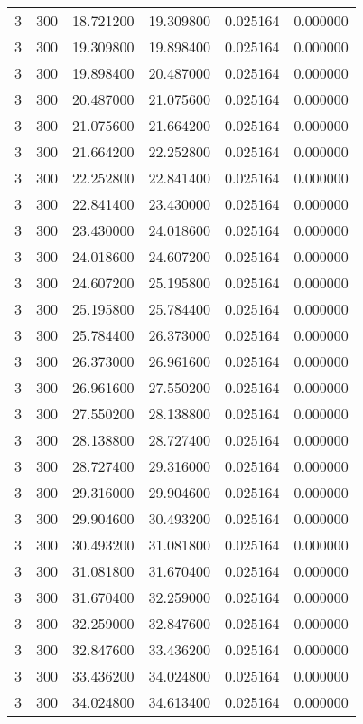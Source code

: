\begin{longtable}{rrrrrr}
3 & 300 & 18.721200 & 19.309800 & 0.025164 & 0.000000 \\
3 & 300 & 19.309800 & 19.898400 & 0.025164 & 0.000000 \\
3 & 300 & 19.898400 & 20.487000 & 0.025164 & 0.000000 \\
3 & 300 & 20.487000 & 21.075600 & 0.025164 & 0.000000 \\
3 & 300 & 21.075600 & 21.664200 & 0.025164 & 0.000000 \\
3 & 300 & 21.664200 & 22.252800 & 0.025164 & 0.000000 \\
3 & 300 & 22.252800 & 22.841400 & 0.025164 & 0.000000 \\
3 & 300 & 22.841400 & 23.430000 & 0.025164 & 0.000000 \\
3 & 300 & 23.430000 & 24.018600 & 0.025164 & 0.000000 \\
3 & 300 & 24.018600 & 24.607200 & 0.025164 & 0.000000 \\
3 & 300 & 24.607200 & 25.195800 & 0.025164 & 0.000000 \\
3 & 300 & 25.195800 & 25.784400 & 0.025164 & 0.000000 \\
3 & 300 & 25.784400 & 26.373000 & 0.025164 & 0.000000 \\
3 & 300 & 26.373000 & 26.961600 & 0.025164 & 0.000000 \\
3 & 300 & 26.961600 & 27.550200 & 0.025164 & 0.000000 \\
3 & 300 & 27.550200 & 28.138800 & 0.025164 & 0.000000 \\
3 & 300 & 28.138800 & 28.727400 & 0.025164 & 0.000000 \\
3 & 300 & 28.727400 & 29.316000 & 0.025164 & 0.000000 \\
3 & 300 & 29.316000 & 29.904600 & 0.025164 & 0.000000 \\
3 & 300 & 29.904600 & 30.493200 & 0.025164 & 0.000000 \\
3 & 300 & 30.493200 & 31.081800 & 0.025164 & 0.000000 \\
3 & 300 & 31.081800 & 31.670400 & 0.025164 & 0.000000 \\
3 & 300 & 31.670400 & 32.259000 & 0.025164 & 0.000000 \\
3 & 300 & 32.259000 & 32.847600 & 0.025164 & 0.000000 \\
3 & 300 & 32.847600 & 33.436200 & 0.025164 & 0.000000 \\
3 & 300 & 33.436200 & 34.024800 & 0.025164 & 0.000000 \\
3 & 300 & 34.024800 & 34.613400 & 0.025164 & 0.000000 \\

\end{longtable}
